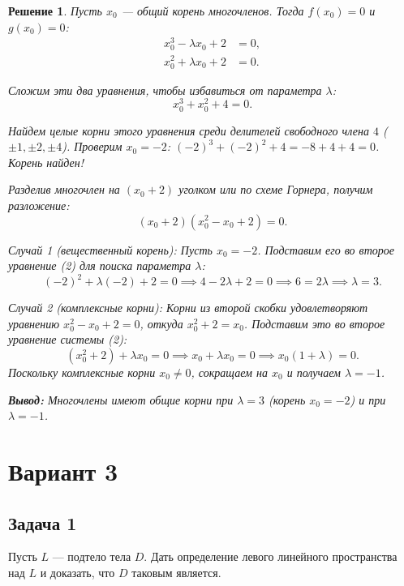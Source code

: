 \documentclass[14pt]{article}
\newtheorem*{solution}{Решение}
\begin{document}
	\begin{solution}
		Пусть $x_0$ — общий корень многочленов. Тогда $f(x_0) = 0$ и $g(x_0) = 0$:
		\begin{align}
			x_0^3 - \lambda x_0 + 2 &= 0, \\
			x_0^2 + \lambda x_0 + 2 &= 0.
		\end{align}
		
		Сложим эти два уравнения, чтобы избавиться от параметра $\lambda$:
		\[
		x_0^3 + x_0^2 + 4 = 0.
		\]
		
		Найдем целые корни этого уравнения среди делителей свободного члена $4$ ($\pm 1, \pm 2, \pm 4$).
		Проверим $x_0 = -2$: $(-2)^3 + (-2)^2 + 4 = -8 + 4 + 4 = 0$. Корень найден!
		
		Разделив многочлен на $(x_0 + 2)$ уголком или по схеме Горнера, получим разложение: 
		\[
		(x_0 + 2)(x_0^2 - x_0 + 2) = 0.
		\]
		
		Случай 1 (вещественный корень): Пусть $x_0 = -2$. Подставим его во второе уравнение (2) для поиска параметра $\lambda$:
		\[
		(-2)^2 + \lambda(-2) + 2 = 0 \implies 4 - 2\lambda + 2 = 0 \implies 6 = 2\lambda \implies \lambda = 3.
		\]
		
		Случай 2 (комплексные корни): Корни из второй скобки удовлетворяют уравнению $x_0^2 - x_0 + 2 = 0$, откуда $x_0^2 + 2 = x_0$. Подставим это во второе уравнение системы (2):
		\[
		(x_0^2 + 2) + \lambda x_0 = 0 \implies x_0 + \lambda x_0 = 0 \implies x_0(1 + \lambda) = 0.
		\]
		Поскольку комплексные корни $x_0 \neq 0$, сокращаем на $x_0$ и получаем $\lambda = -1$.
		
		\textbf{Вывод:} Многочлены имеют общие корни при $\lambda = 3$ (корень $x_0 = -2$) и при $\lambda = -1$.
	\end{solution}
	
	\newpage
	
	\section{Вариант 3}
	
	\subsection*{Задача 1}
	Пусть $L$ — подтело тела $D$. Дать определение левого линейного пространства над $L$ и доказать, что $D$ таковым является.
	
\end{document}
